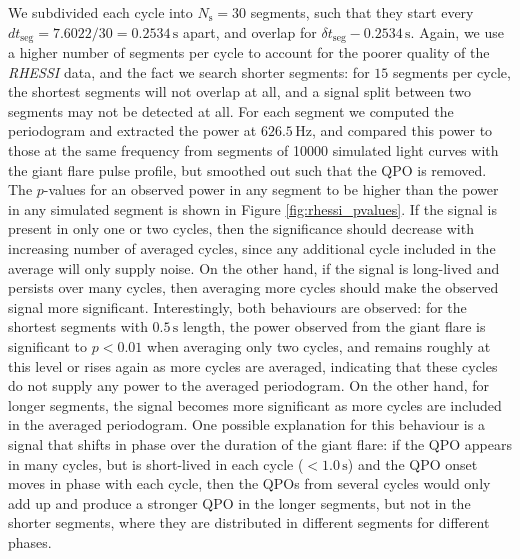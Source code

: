 \documentclass{emulateapj}
\begin{document}
We subdivided each cycle into $N_\mathrm{s} = 30$ segments, such that they start every $d t_\mathrm{seg}= 7.6022/30 = 0.2534 \, \mathrm{s}$ apart, and overlap for $\delta t_\mathrm{seg} - 0.2534 \, \mathrm{s}$. Again, we use a higher number of segments per cycle to account for the poorer quality of the {\it RHESSI} data, and the fact we search shorter segments: for $15$ segments per cycle, the shortest segments will not overlap at all, and a signal split between two segments may not be detected at all.
For each segment we computed the periodogram and extracted the power at $626.5 \, \mathrm{Hz}$, and compared this power to those at the same frequency from segments of 10000 simulated light curves with the giant flare pulse profile, but smoothed out such that the QPO is removed. The $p$-values for an observed power in any segment to be higher than the power in any simulated segment is shown in Figure \ref{fig:rhessi_pvalues}. If the signal is present in only one or two cycles, then the significance should decrease with increasing number of averaged cycles, since any additional cycle included in the average will only supply noise. On the other hand, if the signal is long-lived and persists over many cycles, then averaging more cycles should make the observed signal more significant. Interestingly, both behaviours are observed: for the shortest segments with $0.5\, \mathrm{s}$ length, the power observed from the giant flare is significant to $p < 0.01$ when averaging only two cycles, and remains roughly at this level or rises again as more cycles are averaged, indicating that these cycles do not supply any power to the averaged periodogram. On the other hand, for longer segments, the signal becomes more significant as more cycles are included in the averaged periodogram. One possible explanation for this behaviour is a signal that shifts in phase over the duration of the giant flare: if the QPO appears in many cycles, but is short-lived in each cycle ($<1.0 \, \mathrm{s}$) and the QPO onset moves in phase with each cycle, then the QPOs from several cycles would only add up and produce a stronger QPO in the longer segments, but not in the shorter segments, where they are distributed in different segments for different phases. 
\end{document}
